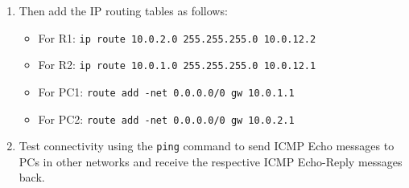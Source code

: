 \documentclass[pdftex,12pt,a4paper]{article}
\begin{document}
\begin{enumerate}
\begin{itemize}
\begin{itemize}
                                subnet mask 255.255.255.0.
                        \end{itemize}
                    \item Configure \texttt{R2}'s interfaces as follows:
                        \begin{itemize}
                            \item GigabitEthernet 0/0: IPv4 address 10.0.12.2,
                                subnet mask 255.255.255.0.
                            \item GigabitEthernet 0/1: IPv4 address 10.0.2.1,
                                subnet mask 255.255.255.0.
                        \end{itemize}
                    \item Configure\footnote{\texttt{ifconfig eth0 10.0.1.2/24}}
                        \texttt{\texttt{PC1}}'s interfaces as follows:
                        \begin{itemize}
                            \item eth0: IPv4 address 10.0.1.2,
                                subnet mask 255.255.255.0.
                        \end{itemize}
                    \item Configure \texttt{\texttt{PC2}}'s interfaces as follows:
                        \begin{itemize}
                            \item eth0: IPv4 address 10.0.2.2,
                                subnet mask 255.255.255.0.
                        \end{itemize}
                \end{itemize}
                
            \item Then add the IP routing tables as follows:
                \begin{itemize}
                    \item For R1: \texttt{ip route 10.0.2.0 255.255.255.0
                        10.0.12.2}
                    \item For R2: \texttt{ip route 10.0.1.0 255.255.255.0
                        10.0.12.1}
                    \item For PC1: \texttt{route add -net 0.0.0.0/0 gw
                        10.0.1.1}
                    \item For PC2: \texttt{route add -net 0.0.0.0/0 gw
                                10.0.2.1}
                \end{itemize}
            \item Test connectivity using the \texttt{ping} command to send
                ICMP Echo messages to PCs in other networks and receive the
                respective ICMP Echo-Reply messages back.
        \end{enumerate}
\end{document}

